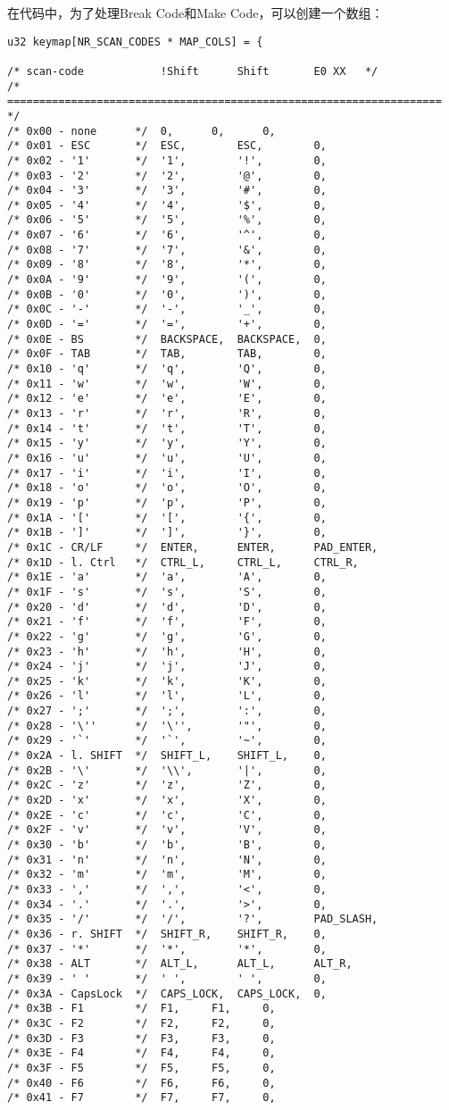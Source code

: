 \documentclass[a4paper,left=2.5cm,right=2.5cm,11pt]{article}
\begin{document}
	在代码中，为了处理Break Code和Make Code，可以创建一个数组：
	\begin{lstlisting}
u32 keymap[NR_SCAN_CODES * MAP_COLS] = {

/* scan-code			!Shift		Shift		E0 XX	*/
/* ==================================================================== */
/* 0x00 - none		*/	0,		0,		0,
/* 0x01 - ESC		*/	ESC,		ESC,		0,
/* 0x02 - '1'		*/	'1',		'!',		0,
/* 0x03 - '2'		*/	'2',		'@',		0,
/* 0x04 - '3'		*/	'3',		'#',		0,
/* 0x05 - '4'		*/	'4',		'$',		0,
/* 0x06 - '5'		*/	'5',		'%',		0,
/* 0x07 - '6'		*/	'6',		'^',		0,
/* 0x08 - '7'		*/	'7',		'&',		0,
/* 0x09 - '8'		*/	'8',		'*',		0,
/* 0x0A - '9'		*/	'9',		'(',		0,
/* 0x0B - '0'		*/	'0',		')',		0,
/* 0x0C - '-'		*/	'-',		'_',		0,
/* 0x0D - '='		*/	'=',		'+',		0,
/* 0x0E - BS		*/	BACKSPACE,	BACKSPACE,	0,
/* 0x0F - TAB		*/	TAB,		TAB,		0,
/* 0x10 - 'q'		*/	'q',		'Q',		0,
/* 0x11 - 'w'		*/	'w',		'W',		0,
/* 0x12 - 'e'		*/	'e',		'E',		0,
/* 0x13 - 'r'		*/	'r',		'R',		0,
/* 0x14 - 't'		*/	't',		'T',		0,
/* 0x15 - 'y'		*/	'y',		'Y',		0,
/* 0x16 - 'u'		*/	'u',		'U',		0,
/* 0x17 - 'i'		*/	'i',		'I',		0,
/* 0x18 - 'o'		*/	'o',		'O',		0,
/* 0x19 - 'p'		*/	'p',		'P',		0,
/* 0x1A - '['		*/	'[',		'{',		0,
/* 0x1B - ']'		*/	']',		'}',		0,
/* 0x1C - CR/LF		*/	ENTER,		ENTER,		PAD_ENTER,
/* 0x1D - l. Ctrl	*/	CTRL_L,		CTRL_L,		CTRL_R,
/* 0x1E - 'a'		*/	'a',		'A',		0,
/* 0x1F - 's'		*/	's',		'S',		0,
/* 0x20 - 'd'		*/	'd',		'D',		0,
/* 0x21 - 'f'		*/	'f',		'F',		0,
/* 0x22 - 'g'		*/	'g',		'G',		0,
/* 0x23 - 'h'		*/	'h',		'H',		0,
/* 0x24 - 'j'		*/	'j',		'J',		0,
/* 0x25 - 'k'		*/	'k',		'K',		0,
/* 0x26 - 'l'		*/	'l',		'L',		0,
/* 0x27 - ';'		*/	';',		':',		0,
/* 0x28 - '\''		*/	'\'',		'"',		0,
/* 0x29 - '`'		*/	'`',		'~',		0,
/* 0x2A - l. SHIFT	*/	SHIFT_L,	SHIFT_L,	0,
/* 0x2B - '\'		*/	'\\',		'|',		0,
/* 0x2C - 'z'		*/	'z',		'Z',		0,
/* 0x2D - 'x'		*/	'x',		'X',		0,
/* 0x2E - 'c'		*/	'c',		'C',		0,
/* 0x2F - 'v'		*/	'v',		'V',		0,
/* 0x30 - 'b'		*/	'b',		'B',		0,
/* 0x31 - 'n'		*/	'n',		'N',		0,
/* 0x32 - 'm'		*/	'm',		'M',		0,
/* 0x33 - ','		*/	',',		'<',		0,
/* 0x34 - '.'		*/	'.',		'>',		0,
/* 0x35 - '/'		*/	'/',		'?',		PAD_SLASH,
/* 0x36 - r. SHIFT	*/	SHIFT_R,	SHIFT_R,	0,
/* 0x37 - '*'		*/	'*',		'*',    	0,
/* 0x38 - ALT		*/	ALT_L,		ALT_L,  	ALT_R,
/* 0x39 - ' '		*/	' ',		' ',		0,
/* 0x3A - CapsLock	*/	CAPS_LOCK,	CAPS_LOCK,	0,
/* 0x3B - F1		*/	F1,		F1,		0,
/* 0x3C - F2		*/	F2,		F2,		0,
/* 0x3D - F3		*/	F3,		F3,		0,
/* 0x3E - F4		*/	F4,		F4,		0,
/* 0x3F - F5		*/	F5,		F5,		0,
/* 0x40 - F6		*/	F6,		F6,		0,
/* 0x41 - F7		*/	F7,		F7,		0,

\end{lstlisting}
\end{document}
